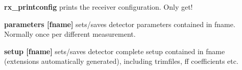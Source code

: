 \begin{DoxyItemize}
\item {\bfseries rx\_\-printconfig} prints the receiver configuration. Only get!
\end{DoxyItemize}


\begin{DoxyItemize}
\item {\bfseries parameters \mbox{[}fname\mbox{]}} sets/saves detector parameters contained in fname. Normally once per different measurement.
\end{DoxyItemize}


\begin{DoxyItemize}
\item {\bfseries setup \mbox{[}fname\mbox{]}} sets/saves detector complete setup contained in fname (extensions automatically generated), including trimfiles, ff coefficients etc. 
\end{DoxyItemize}